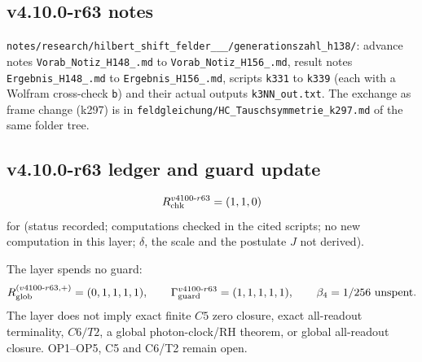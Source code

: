 \subsection*{v4.10.0-r63 notes}
\label{subsec:v4100-r63-notes}

{\raggedright
\texttt{notes/\allowbreak research/\allowbreak hilbert\_\allowbreak shift\_\allowbreak felder\_\_\_/\allowbreak generationszahl\_\allowbreak h138/}:
advance notes \texttt{Vorab\_\allowbreak Notiz\_\allowbreak H148\_\allowbreak *.md} to \texttt{Vorab\_\allowbreak Notiz\_\allowbreak H156\_\allowbreak *.md}, result notes
\texttt{Ergebnis\_\allowbreak H148\_\allowbreak *.md} to \texttt{Ergebnis\_\allowbreak H156\_\allowbreak *.md}, scripts \texttt{k331} to \texttt{k339} (each with a
Wolfram cross-check \texttt{b}) and their actual outputs \texttt{k3NN\_\allowbreak out.txt}.  The exchange as frame change (k297) is in
\texttt{feldgleichung/\allowbreak HC\_\allowbreak Tauschsymmetrie\_\allowbreak k297.md} of the same folder tree.
\par}

\subsection*{v4.10.0-r63 ledger and guard update}
\label{subsec:v4100-r63-ledger-guard}

\[
R_{\rm chk}^{v4100\text{-}r63}=(1,1,0)
\]
for (status recorded; computations checked in the cited scripts; no new computation in this layer; \(\delta\), the scale and the postulate \(J\) not derived).

The layer spends no guard:
\[
R_{\rm glob}^{(v4100\text{-}r63,+)}=(0,1,1,1,1),
\qquad
\Gamma_{\rm guard}^{v4100\text{-}r63}=(1,1,1,1,1),
\qquad
\beta_4=1/256\ \text{unspent}.
\]
The layer does not imply exact finite \(C5\) zero closure, exact all-readout terminality, \(C6/T2\), a global photon-clock/RH theorem,
or global all-readout closure.  OP1--OP5, C5 and C6/T2 remain open.
